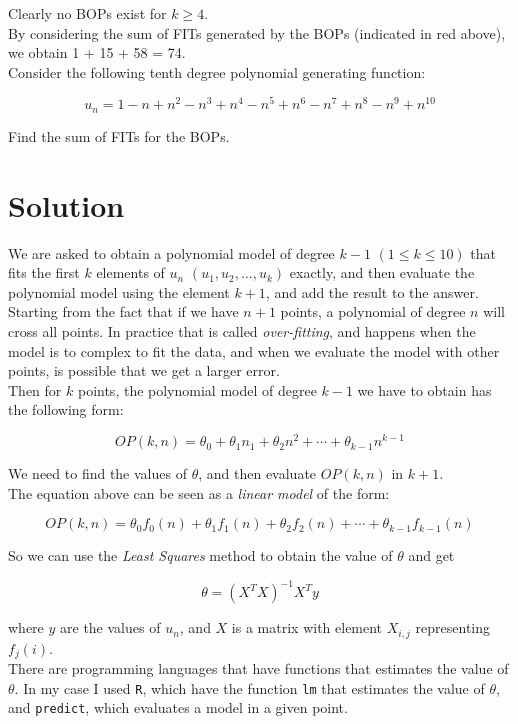 Clearly no BOPs exist for $k \geq 4$.\\

By considering the sum of FITs generated by the BOPs (indicated in red above), we obtain 1 + 15 + 58 = 74.\\

Consider the following tenth degree polynomial generating function:

$$
u_n = 1 - n + n^2 - n^3 + n^4 - n^5 + n^6 - n^7 + n^8 - n^9 + n^{10}
$$

Find the sum of FITs for the BOPs.

\section*{Solution}

We are asked to obtain a polynomial model of degree $k-1$ $(1 \leq k \leq 10)$ that fits the first $k$ elements of $u_n$ $(u_1, u_2, \ldots, u_k)$ exactly, and then evaluate the polynomial model using the element $k+1$, and add the result to the answer.\\

Starting from the fact that if we have $n+1$ points, a polynomial of degree $n$ will cross all points. In practice that is called \textit{over-fitting}, and happens when the model is to complex to fit the data, and when we evaluate the model with other points, is possible that we get a larger error.\\

Then for $k$ points, the polynomial model of degree $k-1$ we have to obtain has the following form:

$$
OP(k,n) = \theta_0 + \theta_1n_1 + \theta_2n^2 + \cdots + \theta_{k-1}n^{k-1}
$$

We need to find the values of $\theta$, and then evaluate $OP(k,n)$ in $k+1$.\\

The equation above can be seen as a \textit{linear model} of the form:

$$
OP(k,n) = \theta_0f_0(n) + \theta_1f_1(n) + \theta_2f_2(n) + \cdots + \theta_{k-1}f_{k-1}(n)
$$

So we can use the \textit{Least Squares} method to obtain the value of $\theta$ and get

$$
\theta = (X^TX)^{-1}X^T y
$$

where $y$ are the values of $u_n$, and $X$ is a matrix with element $X_{i,j}$ representing $f_j(i)$.\\

There are programming languages that have functions that estimates the value of $\theta$. In my case I used \texttt{R}, which have the function \texttt{lm} that estimates the value of $\theta$, and \texttt{predict}, which evaluates a model in a given point.